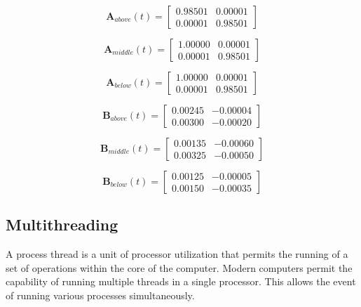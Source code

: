 \documentclass[12pt]{article}
\begin{document}
\begin{equation}
\label{eqn:5}
\mathbf{A}_{above}(t) = 
\begin{bmatrix}
0.98501 & 0.00001 \\
0.00001 & 0.98501
\end{bmatrix}
\end{equation}

\begin{equation}
\label{eqn:6}
\mathbf{A}_{middle}(t) = 
\begin{bmatrix}
1.00000 & 0.00001 \\
0.00001 & 0.98501
\end{bmatrix}
\end{equation}

\begin{equation}
\label{eqn:7}
\mathbf{A}_{below}(t) = 
\begin{bmatrix}
1.00000 & 0.00001 \\
0.00001 & 0.98501
\end{bmatrix}
\end{equation}

\begin{equation}
\label{eqn:8}
\mathbf{B}_{above}(t) = 
\begin{bmatrix}
0.00245 & -0.00004 \\
0.00300 & -0.00020
\end{bmatrix}
\end{equation}

\begin{equation}
\label{eqn:9}
\mathbf{B}_{middle}(t) = 
\begin{bmatrix}
0.00135 & -0.00060 \\
0.00325 & -0.00050
\end{bmatrix}
\end{equation}

\begin{equation}
\label{eqn:10}
\mathbf{B}_{below}(t) = 
\begin{bmatrix}
0.00125 & -0.00005 \\
0.00150 & -0.00035
\end{bmatrix}
\end{equation}

\subsection{Multithreading}

A process thread is a unit of processor utilization that permits the running of a set of operations within the core of the computer. Modern computers permit the capability of running multiple threads in a single processor. This allows the event of running various processes simultaneously. \\
\end{document}
